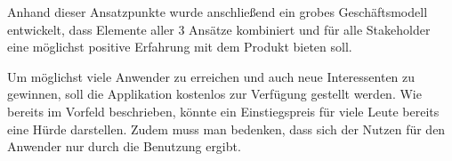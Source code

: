\newpage
Anhand dieser Ansatzpunkte wurde anschließend ein grobes Geschäftsmodell entwickelt, dass Elemente aller 3 Ansätze kombiniert und für alle Stakeholder eine möglichst positive Erfahrung mit dem Produkt bieten soll.

Um möglichst viele Anwender zu erreichen und auch neue Interessenten zu gewinnen, soll die Applikation kostenlos zur Verfügung gestellt werden. Wie bereits im Vorfeld beschrieben, könnte ein Einstiegspreis für viele Leute bereits eine Hürde darstellen. Zudem muss man bedenken, dass sich der Nutzen für den Anwender nur durch die Benutzung ergibt. 